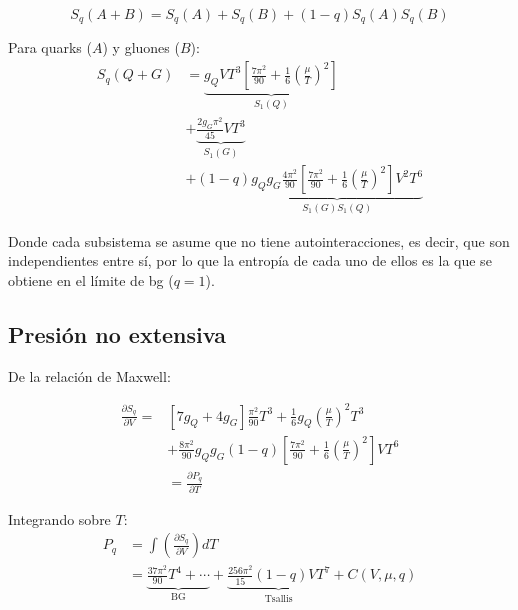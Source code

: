 \begin{equation}
{S}_{q}(A+B) = {S}_q(A) + {S}_q(B) + (1-q){S}_q(A){S}_q(B)
\end{equation}

Para quarks ($A$) y gluones ($B$):
\begin{align}
{S}_q(Q+G) &= \underbrace{{g}_Q V T^3 \left[\frac{7\pi^2}{90} + \frac{1}{6}\left(\frac{\mu}{T}\right)^2\right]}_{{S}_{1}(Q)} \nonumber \\
&+ \underbrace{\frac{2g_G\pi^2}{45}V T^3}_{{S}_{1}(G)} \nonumber \\
&+ \left(1-q \right)\underbrace{{g}_{Q}{g}_{G} \frac{4{\pi}^{2}}{90} \left[\frac{7{\pi}^{2}}{90} + \frac{1}{6} \left(\frac{\mu}{T} \right)^{2}\right]{V}^{2}{T}^{6}}_{{S}_{1}(G){S}_{1}(Q)} 
\end{align}

Donde cada subsistema se asume que no tiene autointeracciones, es decir, que son independientes entre sí, por lo que la entropía de cada uno de ellos es la que se obtiene en el límite de \acrshort{bg} ($q=1$). 

\subsection{Presión no extensiva}\label{app:Tsallis-pressure}
De la relación de Maxwell:


\begin{equation}
\begin{split}
\frac{\partial{S}_{q}}{\partial V}   =  & \left[ 7{g}_{Q} + 4 {g}_{G}\right] \frac{{\pi}^{2}}{90} {T}^{3} + \frac{1}{6} {g}_{Q} \left(\frac{\mu}{T} \right)^{2} {T}^{3}\\
& + \frac{8{\pi}^{2}}{90} {g}_{Q}{g}_{G} (1-q) \left[ \frac{7{\pi}^{2}}{90} + \frac{1}{6} \left(\frac{\mu}{T} \right)^{2} \right]V{T}^{6}\\
& = \frac{\partial{P}_{q}}{\partial T}
\end{split}
\end{equation}

Integrando sobre $T$:
\begin{align}
{P}_q &= \int \left(\frac{\partial{S}_q}{\partial V}\right) dT \nonumber \\
&= \underbrace{\frac{37\pi^2}{90}T^4 + \cdots}_{\text{BG}} + \underbrace{\frac{256\pi^2}{15}(1-q)V T^7}_{\text{Tsallis}} + C(V,\mu,q)
\end{align}

